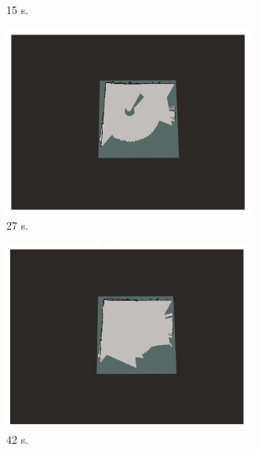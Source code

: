 \documentclass[11pt,openany]{book}
\begin{document}
\begin{algorimth}[H]
\begin{figure}[H]
\begin{subfigure}[H]{0.3\linewidth}
        \caption{{15 s.}}
        \label{fig:4.12b}
    \end{subfigure}
    \begin{subfigure}[H]{0.3\linewidth}
        \includegraphics[width=\linewidth]{assets/4_12_c.png}
        \caption{{27 s.}}
        \label{fig:4.12c}
    \end{subfigure}
    \begin{subfigure}[H]{0.3\linewidth}
        \includegraphics[width=\linewidth]{assets/4_12_d.png}
        \caption{{42 s.}}
        \label{fig:4.12d}
    \end{subfigure}
    \begin{subfigure}[H]{0.3\linewidth}

\end{subfigure}
\end{figure}
\end{algorimth}
\end{document}
